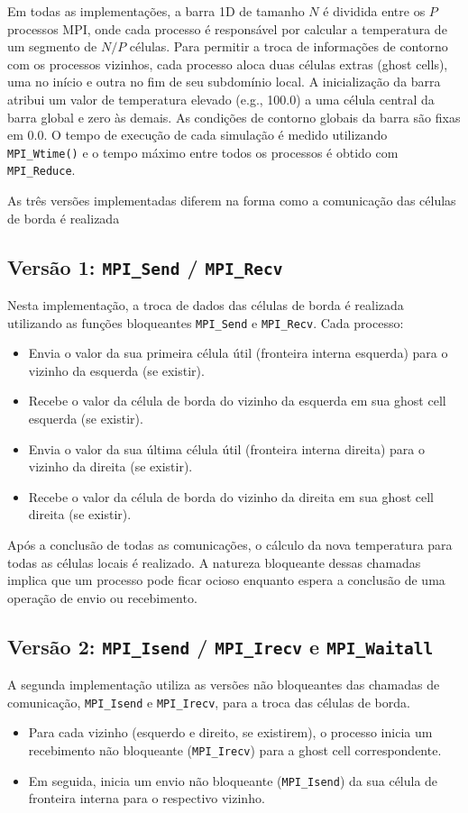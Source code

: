 \documentclass[a4paper, 12pt]{article}
\begin{document}
	Em todas as implementações, a barra 1D de tamanho $N$ é dividida entre os $P$ processos MPI, onde cada processo é responsável por calcular a temperatura de um segmento de $N/P$ células. Para permitir a troca de informações de contorno com os processos vizinhos, cada processo aloca duas células extras (ghost cells), uma no início e outra no fim de seu subdomínio local. A inicialização da barra atribui um valor de temperatura elevado (e.g., 100.0) a uma célula central da barra global e zero às demais. As condições de contorno globais da barra são fixas em 0.0. O tempo de execução de cada simulação é medido utilizando \texttt{MPI\_Wtime()} e o tempo máximo entre todos os processos é obtido com \texttt{MPI\_Reduce}.
	
	As três versões implementadas diferem na forma como a comunicação das células de borda é
	realizada
	
	\subsection*{Versão 1: \texttt{MPI\_Send} / \texttt{MPI\_Recv}}
	Nesta implementação, a troca de dados das células de borda é realizada utilizando as funções bloqueantes \texttt{MPI\_Send} e \texttt{MPI\_Recv}. Cada processo:
	\begin{itemize}
		\item Envia o valor da sua primeira célula útil (fronteira interna esquerda) para o vizinho da esquerda (se existir).
		\item Recebe o valor da célula de borda do vizinho da esquerda em sua ghost cell esquerda (se existir).
		\item Envia o valor da sua última célula útil (fronteira interna direita) para o vizinho da direita (se existir).
		\item Recebe o valor da célula de borda do vizinho da direita em sua ghost cell direita (se existir).
	\end{itemize}
	Após a conclusão de todas as comunicações, o cálculo da nova temperatura para todas as células locais é realizado. A natureza bloqueante dessas chamadas implica que um processo pode ficar ocioso enquanto espera a conclusão de uma operação de envio ou recebimento.
	
	\subsection*{Versão 2: \texttt{MPI\_Isend} / \texttt{MPI\_Irecv} e \texttt{MPI\_Waitall}}
	A segunda implementação utiliza as versões não bloqueantes das chamadas de comunicação, \texttt{MPI\_Isend} e \texttt{MPI\_Irecv}, para a troca das células de borda.
	\begin{itemize}
		\item Para cada vizinho (esquerdo e direito, se existirem), o processo inicia um recebimento não bloqueante (\texttt{MPI\_Irecv}) para a ghost cell correspondente.
		\item Em seguida, inicia um envio não bloqueante (\texttt{MPI\_Isend}) da sua célula de fronteira interna para o respectivo vizinho.
	\end{itemize}
	
\end{document}
